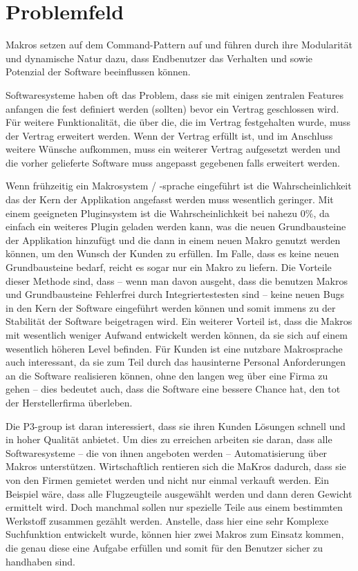 \section{Problemfeld}
\label{sec:problemfeld}
  Makros setzen auf dem Command-Pattern auf und führen durch ihre Modularität und dynamische Natur dazu, dass Endbenutzer das Verhalten und sowie Potenzial der Software beeinflussen können.

  Softwaresysteme haben oft das Problem, dass sie mit einigen zentralen Features anfangen die fest definiert werden (sollten) bevor ein Vertrag geschlossen wird. Für weitere Funktionalität, die über die, die im Vertrag festgehalten wurde, muss der Vertrag erweitert werden. Wenn der Vertrag erfüllt ist, und im Anschluss weitere Wünsche aufkommen, muss ein weiterer Vertrag aufgesetzt werden und die vorher gelieferte Software muss angepasst gegebenen falls erweitert werden.

  Wenn frühzeitig ein Makrosystem / -sprache eingeführt ist die Wahrscheinlichkeit das der Kern der Applikation angefasst werden muss wesentlich geringer. Mit einem geeigneten Pluginsystem ist die Wahrscheinlichkeit bei nahezu $0\%$, da einfach ein weiteres Plugin geladen werden kann, was die neuen Grundbausteine der Applikation hinzufügt und die dann in einem neuen Makro genutzt werden können, um den Wunsch der Kunden zu erfüllen. Im Falle, dass es keine neuen Grundbausteine bedarf, reicht es sogar nur ein Makro zu liefern. Die Vorteile dieser Methode sind, dass -- wenn man davon ausgeht, dass die benutzen Makros und Grundbausteine Fehlerfrei durch Integriertestesten sind -- keine neuen Bugs in den Kern der Software eingeführt werden können und somit immens zu der Stabilität der Software beigetragen wird. Ein weiterer Vorteil ist, dass die Makros mit wesentlich weniger Aufwand entwickelt werden können, da sie sich auf einem wesentlich höheren Level befinden. Für Kunden ist eine nutzbare Makrosprache auch interessant, da sie zum Teil durch das hausinterne Personal Anforderungen an die Software realisieren können, ohne den langen weg über eine Firma zu gehen -- dies bedeutet auch, dass die Software eine bessere Chance hat, den tot der Herstellerfirma überleben.

  Die P3-group ist daran interessiert, dass sie ihren Kunden Lösungen schnell und in hoher Qualität anbietet. Um dies zu erreichen arbeiten sie daran, dass alle Softwaresysteme -- die von ihnen angeboten werden -- Automatisierung über Makros unterstützen. Wirtschaftlich rentieren sich die MaKros dadurch, dass sie von den Firmen gemietet werden und nicht nur einmal verkauft werden. Ein Beispiel wäre, dass alle Flugzeugteile ausgewählt werden und dann deren Gewicht ermittelt wird. Doch manchmal sollen nur spezielle Teile aus einem bestimmten Werkstoff zusammen gezählt werden. Anstelle, dass hier eine sehr Komplexe Suchfunktion entwickelt wurde, können hier zwei Makros zum Einsatz kommen, die genau diese eine Aufgabe erfüllen und somit für den Benutzer sicher zu handhaben sind.

